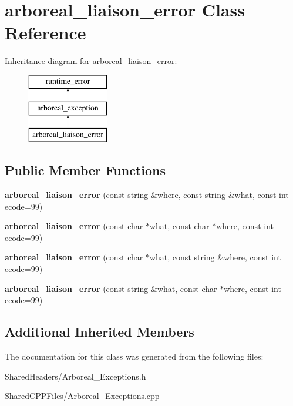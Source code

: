\hypertarget{classarboreal__liaison__error}{}\section{arboreal\+\_\+liaison\+\_\+error Class Reference}
\label{classarboreal__liaison__error}
Inheritance diagram for arboreal\+\_\+liaison\+\_\+error\+:\begin{figure}[H]
\begin{center}
\leavevmode
\includegraphics[height=3.000000cm]{d7/d0c/classarboreal__liaison__error}
\end{center}
\end{figure}
\subsection*{Public Member Functions}
\begin{DoxyCompactItemize}
\item 
\mbox{\label{classarboreal__liaison__error_af23c4a3672c9594e3382a05a1590abc4}} 
{\bfseries arboreal\+\_\+liaison\+\_\+error} (const string \&where, const string \&what, const int ecode=99)
\item 
\mbox{\label{classarboreal__liaison__error_ae9eaf00df34e37262348e254c6dad5ff}} 
{\bfseries arboreal\+\_\+liaison\+\_\+error} (const char $\ast$what, const char $\ast$where, const int ecode=99)
\item 
\mbox{\label{classarboreal__liaison__error_a593436824d649179f5c34b7311c56d2e}} 
{\bfseries arboreal\+\_\+liaison\+\_\+error} (const char $\ast$what, const string \&where, const int ecode=99)
\item 
\mbox{\label{classarboreal__liaison__error_a73221c813d25af214f19eaec704ffffd}} 
{\bfseries arboreal\+\_\+liaison\+\_\+error} (const string \&what, const char $\ast$where, const int ecode=99)
\end{DoxyCompactItemize}
\subsection*{Additional Inherited Members}


The documentation for this class was generated from the following files\+:\begin{DoxyCompactItemize}
\item 
Shared\+Headers/Arboreal\+\_\+\+Exceptions.\+h\item 
Shared\+C\+P\+P\+Files/Arboreal\+\_\+\+Exceptions.\+cpp\end{DoxyCompactItemize}
